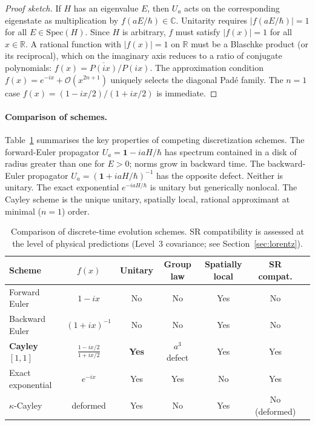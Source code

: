 \documentclass[12pt,a4paper]{article}
\begin{document}
\begin{proof}[Proof sketch]
If $H$ has an eigenvalue $E$, then $U_a$ acts on the corresponding eigenstate as
multiplication by $f(aE/\hbar) \in \mathbb{C}$.  Unitarity requires $|f(aE/\hbar)| = 1$
for all $E \in \mathrm{Spec}(H)$.  Since $H$ is arbitrary, $f$ must satisfy $|f(x)|=1$
for all $x \in \mathbb{R}$.  A rational function with $|f(x)|=1$ on $\mathbb{R}$ must be
a Blaschke product (or its reciprocal), which on the imaginary axis reduces to a ratio
of conjugate polynomials: $f(x) = \overline{P(ix)}/P(ix)$.  The approximation condition
$f(x) = e^{-ix} + \mathcal{O}(x^{2n+1})$ uniquely selects the diagonal Pad\'e family.
The $n=1$ case $f(x) = (1-ix/2)/(1+ix/2)$ is immediate.
\end{proof}

\paragraph{Comparison of schemes.}
Table~\ref{tab:schemes} summarises the key properties of competing discretization schemes.
The forward-Euler propagator $U_a = \mathbf{1} - iaH/\hbar$ has spectrum contained in a
disk of radius greater than one for $E > 0$; norms grow in backward time.  The
backward-Euler propagator $U_a = (\mathbf{1} + iaH/\hbar)^{-1}$ has the opposite defect.
Neither is unitary.  The exact exponential $e^{-iaH/\hbar}$ is unitary but generically
nonlocal.  The Cayley scheme is the unique unitary, spatially local, rational approximant
at minimal ($n=1$) order.

\begin{table}[htb]
\centering
\caption{Comparison of discrete-time evolution schemes.
SR compatibility is assessed at the level of physical predictions (Level~3 covariance;
see Section~\ref{sec:lorentz}).}
\label{tab:schemes}
\renewcommand{\arraystretch}{1.3}
\begin{tabular}{lcccccc}
\toprule
Scheme & $f(x)$ & Unitary & Group law & Spatially local & SR compat. \\
\midrule
Forward Euler & $1-ix$ & No & No & Yes & No \\
Backward Euler & $(1+ix)^{-1}$ & No & No & Yes & No \\
\textbf{Cayley} $[1,1]$ & $\tfrac{1-ix/2}{1+ix/2}$ & \textbf{Yes} & $a^3$ defect & Yes & Yes \\
Exact exponential & $e^{-ix}$ & Yes & Yes & No & Yes \\
$\kappa$-Cayley & deformed & Yes & No & Yes & No (deformed) \\
\bottomrule
\end{tabular}
\end{table}
\end{document}
